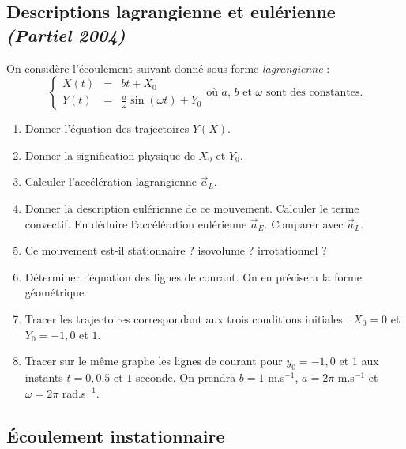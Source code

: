 \subsection{Descriptions lagrangienne et eul\'erienne 
{\small \it (Partiel 2004)}}


On consid\`ere l'\'ecoulement suivant donn\'e sous forme 
\textit{lagrangienne} :
\begin{equation*}
\left\{
\begin{array}{rcl}
X(t) & = & b t + X_0 \\
Y(t) & = & \frac{a}{\omega} \sin(\omega t) + Y_0
\end{array}
\right.
\text{o\`u $a$, $b$ et $\omega$ sont des constantes.}
\end{equation*}
\begin{enumerate}
\item Donner l'\'equation des trajectoires $Y(X)$.
\item Donner la signification physique de $X_0$ et $Y_0$.
\item Calculer l'acc\'el\'eration lagrangienne $\vec{a}_L$.
\item Donner la description eul\'erienne de ce mouvement.
Calculer le terme convectif. En d\'eduire l'acc\'el\'eration
eul\'erienne $\vec{a}_E$. Comparer avec $\vec{a}_L$.
\item Ce mouvement est-il stationnaire ? isovolume ? irrotationnel ?
\item D\'eterminer l'\'equation des lignes de courant. On en pr\'ecisera
la forme g\'eom\'etrique.
\item Tracer les trajectoires correspondant aux trois conditions initiales :
$X_0 = 0$ et $Y_0 = -1, 0$ et $1$.
\item Tracer sur le m\^eme graphe les lignes de courant pour $y_0 = -1, 0$
et $1$ aux instants $t = 0, 0.5$ et $1$ seconde. On prendra 
$b = 1$ m.s$^{-1}$, $a = 2 \pi$ m.s$^{-1}$ et $\omega = 2 \pi$ rad.s$^{-1}$.
\end{enumerate}



\subsection{\'Ecoulement instationnaire}


